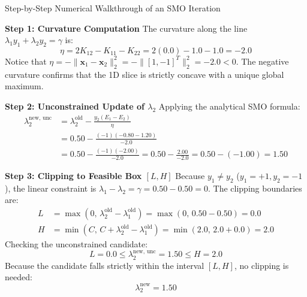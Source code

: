 \begin{examplebox}[breakable]{Step-by-Step Numerical Walkthrough of an SMO Iteration}
\tcblower

\textbf{Step 1: Curvature Computation}
The curvature along the line $\lambda_1 y_1 + \lambda_2 y_2 = \gamma$ is:
\begin{equation}
\eta = 2 K_{12} - K_{11} - K_{22} = 2(0.0) - 1.0 - 1.0 = -2.0
\end{equation}
Notice that $\eta = -\|\mathbf{x}_1 - \mathbf{x}_2\|_2^2 = -\|[1, -1]^T\|_2^2 = -2.0 < 0$. The negative curvature confirms that the 1D slice is strictly concave with a unique global maximum.

\textbf{Step 2: Unconstrained Update of $\lambda_2$}
Applying the analytical SMO formula:
\begin{align}
\lambda_2^{\text{new, unc}} &= \lambda_2^{\text{old}} - \frac{y_2(E_1 - E_2)}{\eta} \nonumber \\
&= 0.50 - \frac{(-1)\left( -0.80 - 1.20 \right)}{-2.0} \nonumber \\
&= 0.50 - \frac{(-1)(-2.00)}{-2.0} = 0.50 - \frac{2.00}{-2.0} = 0.50 - (-1.00) = 1.50
\end{align}

\textbf{Step 3: Clipping to Feasible Box $[L, H]$}
Because $y_1 \ne y_2$ ($y_1 = +1, y_2 = -1$), the linear constraint is $\lambda_1 - \lambda_2 = \gamma = 0.50 - 0.50 = 0$.
The clipping boundaries are:
\begin{align}
L &= \max\left(0, \, \lambda_2^{\text{old}} - \lambda_1^{\text{old}}\right) = \max\left(0, \, 0.50 - 0.50\right) = 0.0 \\
H &= \min\left(C, \, C + \lambda_2^{\text{old}} - \lambda_1^{\text{old}}\right) = \min\left(2.0, \, 2.0 + 0.0\right) = 2.0
\end{align}
Checking the unconstrained candidate:
\begin{equation}
L = 0.0 \le \lambda_2^{\text{new, unc}} = 1.50 \le H = 2.0
\end{equation}
Because the candidate falls strictly within the interval $[L, H]$, no clipping is needed:
\begin{equation}
\lambda_2^{\text{new}} = 1.50
\end{equation}


\end{examplebox}

